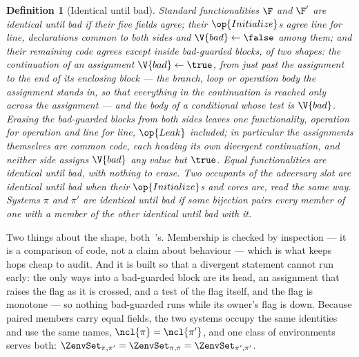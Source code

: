 \documentclass[10pt,oneside,openany]{book}
\theoremstyle{accentdef}
\newtheorem{definition}{Definition}[chapter]
\theoremstyle{accentplain}
\begin{document}
\begin{definition}[Identical until bad]\label{def:iub}
Standard functionalities $\F$ and $\F'$ are \emph{identical until bad} if their five fields
agree; their $\op{Initialize}$s agree line for line, declarations common to both sides and
$\V{bad} \gets \false$ among them; and their remaining code agrees except inside
\emph{bad-guarded} blocks, of two shapes: the continuation of an assignment
$\V{bad} \gets \true$, from just past the assignment to the end of its \emph{enclosing
block} --- the branch, loop or operation body the assignment stands in, so that everything in
the continuation is reached only across the assignment --- and the body of a conditional whose
test is $\V{bad}$. Erasing the bad-guarded blocks from both
sides leaves one functionality, operation for operation and line for line, $\op{Leak}$ included;
in particular the assignments themselves are common code, each heading its own divergent
continuation, and neither side assigns $\V{bad}$ any value but $\true$. Equal
functionalities are identical until bad, with nothing to erase. Two occupants of the adversary
slot are identical until bad when their $\op{Initialize}$s and cores are, read the same way. Systems $\pi$ and $\pi'$
are identical until bad if some bijection pairs every member of one with a member of the other
identical until bad with it.
\end{definition}

Two things about the shape, both~\cite{BR06}'s. Membership is checked by inspection --- it is a
comparison of code, not a claim about behaviour --- which is what keeps hops cheap to audit. And
it is built so that a divergent statement cannot run early: the only ways into a bad-guarded
block are its head, an assignment that raises the flag as it is crossed, and a test of the flag
itself, and the flag is monotone --- so nothing bad-guarded runs while its owner's flag is down.
Because paired members carry equal fields, the two systems occupy the same identities and use
the same names, $\ncl{\pi} = \ncl{\pi'}$, and one class of environments serves both:
$\ZenvSet_{\pi,\pi'} = \ZenvSet_{\pi,\pi} = \ZenvSet_{\pi',\pi'}$.
\end{document}
